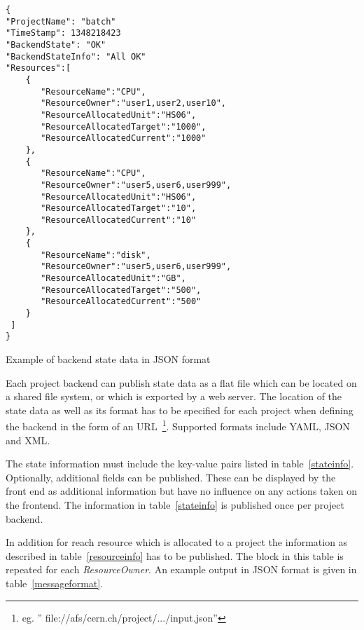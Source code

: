 \begin{table}[bh]
\begin{center}
\begin{verbatim} 
{
"ProjectName": "batch"
"TimeStamp": 1348218423
"BackendState": "OK"
"BackendStateInfo": "All OK"
"Resources":[
    {
       "ResourceName":"CPU",
       "ResourceOwner":"user1,user2,user10",
       "ResourceAllocatedUnit":"HS06",
       "ResourceAllocatedTarget":"1000",
       "ResourceAllocatedCurrent":"1000"
    },
    {
       "ResourceName":"CPU",
       "ResourceOwner":"user5,user6,user999",
       "ResourceAllocatedUnit":"HS06",
       "ResourceAllocatedTarget":"10",
       "ResourceAllocatedCurrent":"10"
    },
    {
       "ResourceName":"disk",
       "ResourceOwner":"user5,user6,user999",
       "ResourceAllocatedUnit":"GB",
       "ResourceAllocatedTarget":"500",
       "ResourceAllocatedCurrent":"500"
    }
 ]
}

\end{verbatim}
\end{center}
\caption{\label{messageformat} Example of backend state data  in JSON format }
\end{table}


Each project backend can publish state data as a flat file which can be located on a shared file system, or which is exported by a web server. The location of the state data as well as its format has to be specified for each project when defining the backend in the form of an URL~\footnote{eg. '' file://afs/cern.ch/project/.../input.json''}. Supported formats include YAML, JSON and XML.

The state information must include the key-value pairs listed in table~\ref{stateinfo}. Optionally, additional fields can be published. These can be displayed by the front end as additional information but have no influence on any actions taken on the frontend. The information in table~\ref{stateinfo} is published once per project backend. 

In addition for reach resource which is allocated to a project the information as described in table~\ref{resourceinfo} has to be published. The block in this table is repeated for each {\it ResourceOwner}. 
An example output in JSON format is given in table~\ref{messageformat}.
